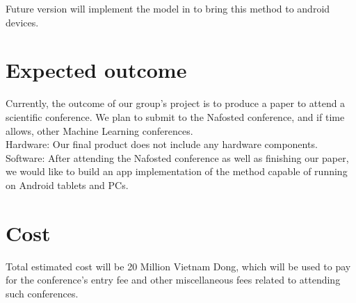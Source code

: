 \documentclass[a4paper,12pt]{report}
\begin{document}
Future version will implement the model in
\textcite{Pacha2017} to bring this method to android devices.

\section{Expected outcome}

Currently, the outcome of our group's project is to produce a paper to attend a scientific conference.
We plan to submit to the Nafosted conference, and if time allows, other Machine Learning conferences.\\

Hardware: Our final product does not include any hardware components.\\

Software: After attending the Nafosted conference as well as finishing our
paper, we would like to build an app implementation of the method capable of
running on Android tablets and PCs.

\section{Cost}
Total estimated cost will be 20 Million Vietnam Dong, which will be used to pay
for the conference's entry fee and other miscellaneous fees related to attending
such conferences.\\


\begin{center}
\end{center}
\end{document}

